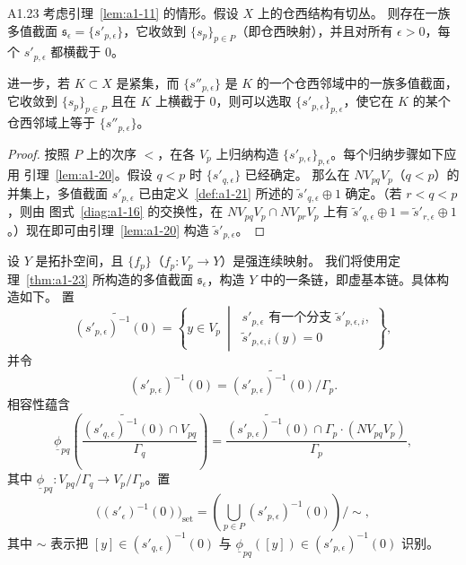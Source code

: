 \begin{theorem}{A1.23}\label{thm:a1-23}
考虑引理~\ref{lem:a1-11} 的情形。假设 $X$ 上的仓西结构有切丛。
则存在一族多值截面
$\mathfrak s_\epsilon=\{s'_{p,\epsilon}\}$，它收敛到
$\{s_p\}_{p\in P}$（即仓西映射），并且对所有 $\epsilon>0$，每个
$s'_{p,\epsilon}$ 都横截于 $0$。

进一步，若 $K\subset X$ 是紧集，而
$\{s''_{p,\epsilon}\}$ 是 $K$ 的一个仓西邻域中的一族多值截面，
它收敛到 $\{s_p\}_{p\in P}$ 且在 $K$ 上横截于 $0$，则可以选取
$\{s'_{p,\epsilon}\}_{p,\epsilon}$，使它在 $K$ 的某个仓西邻域上等于
$\{s''_{p,\epsilon}\}$。
\end{theorem}
\begin{proof}
按照 $P$ 上的次序 $<$，在各 $V_p$ 上归纳构造
$\{s'_{p,\epsilon}\}_{p,\epsilon}$。每个归纳步骤如下应用
引理~\ref{lem:a1-20}。假设 $q<p$ 时 $\{s'_{q,\epsilon}\}$ 已经确定。
那么在 $NV_{pq}V_p$（$q<p$）的并集上，多值截面
$s'_{p,\epsilon}$ 已由定义~\ref{def:a1-21} 所述的
$\widetilde s'_{q,\epsilon}\oplus1$ 确定。（若 $r<q<p$，则由
图式~\eqref{diag:a1-16} 的交换性，在
$NV_{pq}V_p\cap NV_{pr}V_p$ 上有
$\widetilde s'_{q,\epsilon}\oplus1
=\widetilde s'_{r,\epsilon}\oplus1$。）现在即可由引理~\ref{lem:a1-20}
构造 $\widetilde s'_{p,\epsilon}$。
\end{proof}

设 $Y$ 是拓扑空间，且 $\{f_p\}$（$f_p\colon V_p\to Y$）是强连续映射。
我们将使用定理~\ref{thm:a1-23} 所构造的多值截面
$\mathfrak s_\epsilon$，构造 $Y$ 中的一条链，即虚基本链。具体构造如下。
置
\[
 \widetilde{(s'_{p,\epsilon})^{-1}(0)}
 =\left\{y\in V_p\ \middle|\
 \begin{array}{c}
  s'_{p,\epsilon}\text{ 有一个分支 }
  \widetilde s'_{p,\epsilon,i},\\[-0.2em]
  \widetilde s'_{p,\epsilon,i}(y)=0
 \end{array}
 \right\},
\]
并令
\[
 (s'_{p,\epsilon})^{-1}(0)
 =\widetilde{(s'_{p,\epsilon})^{-1}(0)}/\Gamma_p.
\]
相容性蕴含
\begin{equation}
 \underline\phi_{pq}\left(
  \frac{
   \widetilde{(s'_{q,\epsilon})^{-1}(0)}\cap V_{pq}}
       {\Gamma_q}
 \right)
 =
 \frac{
  \widetilde{(s'_{p,\epsilon})^{-1}(0)}
  \cap\Gamma_p\cdot(NV_{pq}V_p)}
 {\Gamma_p},
 \tag{A1.24}\label{eq:a1-24}
\end{equation}
其中
$\underline\phi_{pq}\colon V_{pq}/\Gamma_q\to V_p/\Gamma_p$。置
\[
 \bigl((s'_\epsilon)^{-1}(0)\bigr)_{\mathrm{set}}
 =\left(
   \bigcup_{p\in P}(s'_{p,\epsilon})^{-1}(0)
  \right)\big/\sim,
\]
其中 $\sim$ 表示把
$[y]\in(s'_{q,\epsilon})^{-1}(0)$ 与
$\underline\phi_{pq}([y])\in(s'_{p,\epsilon})^{-1}(0)$ 识别。

